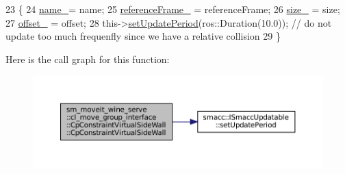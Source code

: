 \begin{DoxyCode}
23         \{
24             \hyperlink{classsm__moveit__wine__serve_1_1cl__move__group__interface_1_1CpConstraintVirtualSideWall_abe1e7ae9ca5d54953ffaaa8d85ff16ac}{name\_}= name;
25             \hyperlink{classsm__moveit__wine__serve_1_1cl__move__group__interface_1_1CpConstraintVirtualSideWall_a832273800ad6780a7b3cd35bc58e4e75}{referenceFrame\_} = referenceFrame;
26             \hyperlink{classsm__moveit__wine__serve_1_1cl__move__group__interface_1_1CpConstraintVirtualSideWall_af00e8ef9042a797b749888256e0d36f4}{size\_} = size;
27             \hyperlink{classsm__moveit__wine__serve_1_1cl__move__group__interface_1_1CpConstraintVirtualSideWall_a15fabbe74d1611af8c7c88ee580b30f6}{offset\_} = offset;
28             this->\hyperlink{classsmacc_1_1ISmaccUpdatable_a88f3b092a81b2d8810a9776c8c69855b}{setUpdatePeriod}(ros::Duration(10.0)); \textcolor{comment}{// do not update too much frequenfly
       since we have a relative collision}
29         \}
\end{DoxyCode}
Here is the call graph for this function\+:
\nopagebreak
\begin{figure}[H]
\begin{center}
\leavevmode
\includegraphics[width=350pt]{classsm__moveit__wine__serve_1_1cl__move__group__interface_1_1CpConstraintVirtualSideWall_a3a360da5959b2be141030456edfa461e_cgraph}
\end{center}
\end{figure}
\mbox{\label{classsm__moveit__wine__serve_1_1cl__move__group__interface_1_1CpConstraintVirtualSideWall_a6767e71e2169b71d969d04fa93b88613}} 
